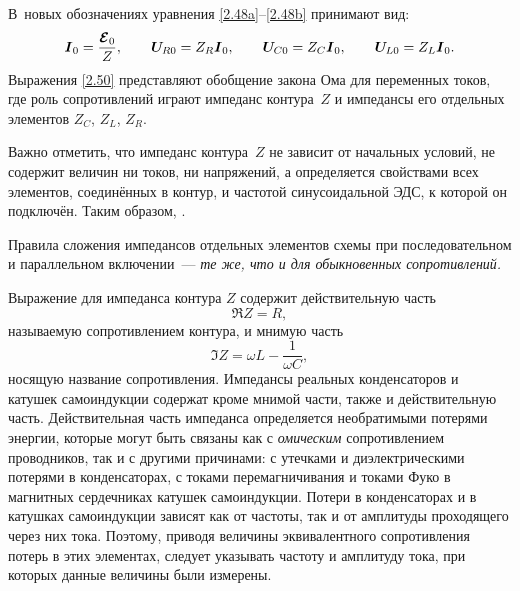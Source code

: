 В~новых обозначениях уравнения \eqref{2.48a}--\eqref{2.48b} принимают вид:
\begin{equation}
	\eqmark{2.50}
	\vec I_0=\frac{\vec{\mathcal{E}}_0}{Z}, \qquad \vec{U}_{\! R0}=Z_R\vec I_0, \qquad 
    \vec{U}_{\! C0}=Z_C\vec I_0, \qquad \vec{U}_{\! L0}=Z_L\vec I_0.
\end{equation}
Выражения \eqref{2.50} представляют обобщение закона Ома для переменных токов,
где роль сопротивлений играют импеданс контура~$Z$ и импедансы
его отдельных элементов $Z_C$, $Z_L$, $Z_R$. 

Важно отметить, что импеданс контура~$Z$ не зависит от начальных условий, не
содержит величин ни токов, ни напряжений, а определяется свойствами всех
элементов, соединённых в контур, и частотой синусоидальной ЭДС, к которой он
подключён. Таким образом, .


Правила сложения импедансов отдельных элементов схемы при
последовательном и параллельном включении~--- \emph{те же, что и для обыкновенных
сопротивлений.}

Выражение для импеданса контура $Z$ содержит действительную часть 
\begin{equation*}
\Re Z=R,
\end{equation*}
называемую  сопротивлением контура, 
и мнимую часть 
\begin{equation*}
\Im Z=\omega L-\frac1{\omega C}, 
\end{equation*}
носящую название 
 сопротивления.
Импедансы реальных конденсаторов и катушек самоиндукции содержат кроме мнимой
части, также и действительную часть. Действительная часть импеданса определяется
необратимыми потерями энергии, которые могут быть связаны как с \emph{омическим}
сопротивлением проводников, так и с другими причинами: с утечками и
диэлектрическими потерями в конденсаторах, с токами перемагничивания и токами
Фуко в магнитных сердечниках катушек самоиндукции. Потери в конденсаторах и в
катушках самоиндукции зависят как от частоты, так и от амплитуды проходящего
через них тока. Поэтому, приводя величины эквивалентного сопротивления потерь в
этих элементах, следует указывать частоту и амплитуду тока, при которых данные
величины были измерены.

